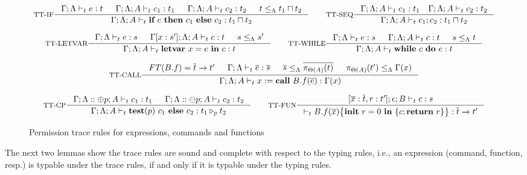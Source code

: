 {{{\begin{figure*}[t]
\begin{tiny}
\[
\inference[TT-IF]
{
\Gamma;\trace \vdash_{t} e : t &
\Gamma;\trace; A \vdash_{t} c_1 : t_1 &
\Gamma;\trace; A \vdash_{t} c_2 : t_2 &
t \leq_{\trace} t_1\sqcap t_2
}
{\Gamma;\trace;  A \vdash_{t} \lcIF{e}{c_1}{c_2} : t_1\sqcap t_2}
\qquad
\inference[TT-SEQ]
{\Gamma;\trace; A \vdash_{t} c_1 : t_1 \quad \Gamma;\trace; A \vdash_{t} c_2 : t _2}
{\Gamma;\trace; A \vdash_{t} \lcSEQ{c_1}{c_2} : t_1\sqcap t_2}
\]

\[
\inference[TT-LETVAR]
{\Gamma;\trace \vdash_{t} e : s &
\Gamma[x:s']; \trace; A \vdash_{t} c : t & s \leq_{\trace} s' }
{\Gamma;\trace; A\vdash_{t} \lcLETVAR{x}{e}{c} :  t}
\qquad
\inference[TT-WHILE]
{
\Gamma;\trace \vdash_{t} e : s &
\Gamma;\trace; A \vdash_{t} c : t &  s\leq_{\trace} t  }
{\Gamma;\trace; A \vdash_{t} \lcWHILE{c}{e} : t }
\]

\[
\inference[TT-CALL]
{
\FT(B.f) = \overline{t} \xrightarrow{} t'  &
\Gamma;\trace \vdash_{t} \overline{e} : \overline{s} &
\overline{s}\leq_{\trace} \overline{\app{t}{\Theta(A)}} &
\app{t'}{\Theta(A)}\leq_{\trace} \Gamma(x)
}
{\Gamma;\trace; A \vdash_{t} \lcCALL{x}{B.f}{\overline{e}} : \Gamma(x)}
\]

\[
\inference[TT-CP]
{\Gamma;\trace::\tplus{ p}; A \vdash_{t} c_1 : t_1 &
\Gamma;\trace::\tminus{p}; A \vdash_{t} c_2 : t_2}
{\Gamma;\trace; A \vdash_{t} \lcCP{p}{c_1}{c_2} : \omerge{p} {t_1}{t_2}}
\qquad
\inference[TT-FUN]
{
[\overline{ x}: \overline{t},\lpRES:t'];\epsilon; B \vdash_{t} c : s
}
{\vdash_{t} \lpPROG{B.f}{\overline{x}}{c}{\lpRES} :  \overline{t}\xrightarrow{} t'}
\]
\end{tiny}
\caption{Permission trace rules for expressions, commands and functions} \label{fig:infer-rules}
\end{figure*}

 

The next two lemmas show the trace rules are sound and complete with respect to the typing rules, i.e., an expression (command, function, resp.)  is typable under the trace rules, if and only if it is typable under the typing rules.

}}}
